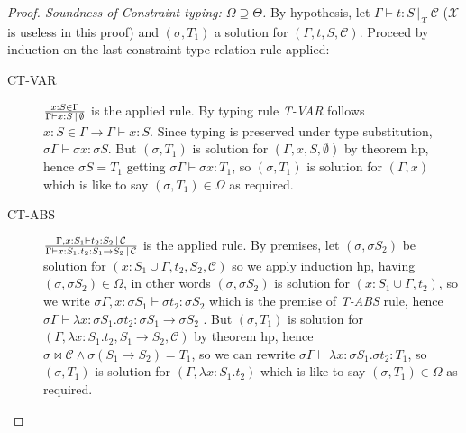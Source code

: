 \documentclass[8pt]{beamer}
\begin{document}
\begin{frame}
    \footnotesize
    \begin{proof}[Proof. Soundness of Constraint typing: 
        $\Omega \supseteq \Theta$]
        By hypothesis, let $\Gamma \vdash t : S \, |_{\mathcal{X}} \,
        \mathcal{C}$ ($\mathcal{X}$ is useless in this proof) and 
        $(\sigma, T_1)$ a solution for $(\Gamma, t, S, \mathcal{C})$.  
        Proceed by induction on the last constraint type relation rule 
        applied:
        \begin{description}
            \item[CT-VAR] ${{x:S\in\Gamma}\over{\Gamma \vdash x:S
                \,|\,\emptyset}}$ is the applied
                rule.  By typing rule \emph{T-VAR} follows $x:S\in 
                \Gamma \rightarrow \Gamma \vdash x:S$. Since typing is 
                preserved under type substitution, $\sigma\Gamma 
                \vdash \sigma x:\sigma S$.  But $(\sigma, T_1)$ is 
                solution for $(\Gamma, x, S, \emptyset)$ by theorem 
                hp, hence $\sigma S = T_1$ getting $\sigma \Gamma 
                \vdash \sigma x:T_1$, so $(\sigma, T_1)$ is solution 
                for $(\Gamma, x)$  which is like to say $(\sigma, 
                T_1)\in\Omega$ as required.
            \item[CT-ABS] ${{\Gamma, x:S_1\vdash t_2: S_2 
                \,|\,\mathcal{C}}\over{\Gamma \vdash x:S_1.t_2:S_1 
                \rightarrow S_2 \,|\,\mathcal{C}}}$ is the applied 
                rule.  By premises, let $(\sigma, \sigma S_2)$ be 
                solution for $(x:S_1 \cup \Gamma, t_2, S_2, 
                \mathcal{C})$ so we apply induction hp, having 
                $(\sigma, \sigma S_2) \in \Omega$, in other
                words $(\sigma, \sigma S_2)$ is solution for $(x:S_1 
                \cup \Gamma, t_2)$, so we write $\sigma\Gamma,x:\sigma 
                S_1 \vdash \sigma t_2 : \sigma S_2$ which is the 
                premise of \emph{T-ABS} rule, hence $\sigma \Gamma 
                \vdash \lambda x:\sigma S_1.\sigma t_2: \sigma S_1 
                \rightarrow \sigma S_2$
                . But $(\sigma, T_1)$ is solution for
                $(\Gamma, \lambda x:S_1.t_2, S_1\rightarrow S_2, 
                \mathcal{C})$ by theorem hp, hence $\sigma \Join 
                \mathcal{C} \wedge \sigma (S_1 \rightarrow S_2) = 
                T_1$, so
                we can rewrite $\sigma \Gamma \vdash \lambda x:\sigma 
                S_1.\sigma t_2:T_1$, so $(\sigma, T_1)$ is solution 
                for $(\Gamma, \lambda x:S_1.t_2)$  which is like to 
                say $(\sigma, T_1) \in \Omega$ as required.  


\end{description}
\end{proof}
\end{frame}
\end{document}
